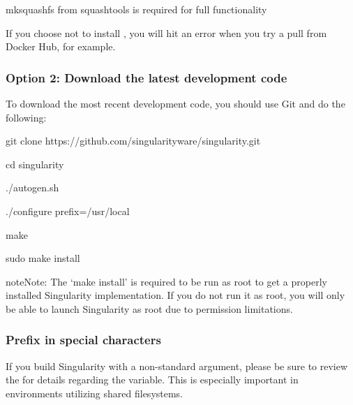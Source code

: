 \documentclass[letterpaper,10pt,english]{sphinxmanual}
\begin{document}
%
\begin{sphinxVerbatim}[commandchars=\\\{\}]
mksquashfs from squash\PYGZhy{}tools is required for full functionality
\end{sphinxVerbatim}

If you choose not to install , you will hit an error when you try a pull from Docker Hub, for example.


\subsubsection{Option 2: Download the latest development code}
\label{\detokenize{installation:option-2-download-the-latest-development-code}}
To download the most recent development code, you should use Git and do the following:

%
\begin{sphinxVerbatim}[commandchars=\\\{\}]
git clone https://github.com/singularityware/singularity.git

cd singularity

./autogen.sh

./configure \PYGZhy{}\PYGZhy{}prefix=/usr/local

make

sudo make install
\end{sphinxVerbatim}

\begin{sphinxadmonition}{note}{Note:}
The ‘make install’ is required to be run as root to get a properly installed Singularity implementation. If you do not run it as root, you will only be able to launch Singularity as root due to permission limitations.
\end{sphinxadmonition}


\subsubsection{Prefix in special characters}
\label{\detokenize{installation:prefix-in-special-characters}}
If you build Singularity with a non-standard  argument, please be sure to review the  for details regarding the  variable. This is especially important in environments utilizing shared filesystems.
\end{document}
